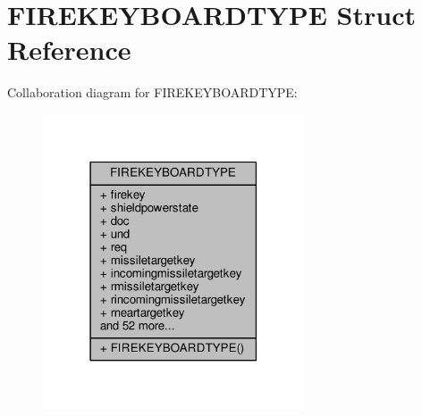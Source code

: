 \hypertarget{structFIREKEYBOARDTYPE}{}\section{F\+I\+R\+E\+K\+E\+Y\+B\+O\+A\+R\+D\+T\+Y\+PE Struct Reference}
\label{structFIREKEYBOARDTYPE}


Collaboration diagram for F\+I\+R\+E\+K\+E\+Y\+B\+O\+A\+R\+D\+T\+Y\+PE\+:
\nopagebreak
\begin{figure}[H]
\begin{center}
\leavevmode
\includegraphics[width=219pt]{de/d1f/structFIREKEYBOARDTYPE__coll__graph}
\end{center}
\end{figure}
